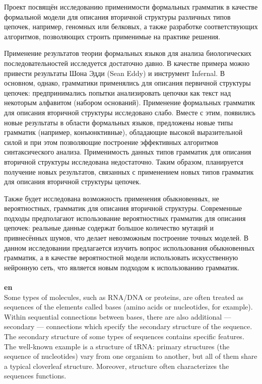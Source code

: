 \documentclass[12pt]{article}  %
\theoremstyle{remark}
\begin{document}
Проект посвящён исследованию применимости формальных грамматик в качестве формальной модели для описания вторичной структуры различных типов цепочек, например, геномных или белковых, а также разработке соответствующих алгоритмов, позволяющих строить применимые на практике решения.

Применение результатов теории формальных языков для анализа биологических последовательностей исследуется достаточно давно.
В качестве примера можно привести результаты Шона Эдди (Sean Eddy) и инструмент Infernal.
В основном, однако, грамматики применялись для описания первичной структуры цепочек: предпринимались попытки анализировать цепочки как текст над некоторым алфавитом (набором оснований).
Применение формальных грамматик для описания вторичной структуры исследовано слабо.
Вместе с этим, появились новые результаты в области формальных языков, предложены новые типы грамматик (например, конъюнктивные), обладающие высокой выразительной силой и при этом позволяющие построение эффективных алгоритмов синтаксического анализа.
Применимость данных типов грамматик для описания вторичной структуры исследована недостаточно.
Таким образом, планируется получение новых результатов, связанных с применением новых типов грамматик для описания вторичной структуры цепочек.

Также будет исследована возможность применения обыкновенных, не вероятностных, грамматик для описания вторичной структуры.
Современные подходы предполагают использование вероятностных грамматик для описания цепочек: реальные данные содержат большое количество мутаций и привнесённых шумов, что делает невозможным построение точных моделей.
В данном исследовании предлагается изучить вопрос использования обыкновенных грамматик, а в качестве вероятностной модели использовать искусственную нейронную сеть, что является новым подходом к использованию грамматик.
\\
\\
\textbf{en}\\
Some types of molecules, such as RNA/DNA or proteins, are often treated as sequences of the elements called bases (amino acids or nucleotides, for example).
Within sequential connections between bases, there are also additional --- secondary --- connections which specify the secondary structure of the sequence.
The secondary structure of some types of sequences contains specific features.
The well-known example is a structure of tRNA: primary structures (the sequence of nucleotides) vary from one organism to another, but all of them share a typical cloverleaf structure. Moreover, structure often characterizes the sequences functions.
\end{document}
